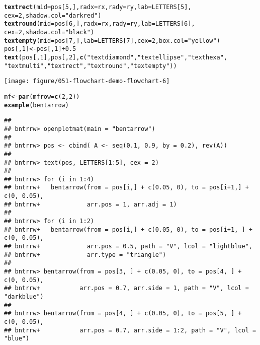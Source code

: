 \documentclass{article}\usepackage[]{graphicx}\usepackage[]{xcolor}
\makeatletter
\def\maxwidth{ %
  \ifdim\Gin@nat@width>\linewidth
    \linewidth
  \else
    \Gin@nat@width
  \fi
}
\newcommand{\hlnum}[1]{\textcolor[rgb]{0.686,0.059,0.569}{#1}}%
\newcommand{\hlsng}[1]{\textcolor[rgb]{0.192,0.494,0.8}{#1}}%
\newcommand{\hlopt}[1]{\textcolor[rgb]{0,0,0}{#1}}%
\newcommand{\hldef}[1]{\textcolor[rgb]{0.345,0.345,0.345}{#1}}%
\newcommand{\hlkwb}[1]{\textcolor[rgb]{0.69,0.353,0.396}{#1}}%
\newcommand{\hlkwc}[1]{\textcolor[rgb]{0.333,0.667,0.333}{#1}}%
\newcommand{\hlkwd}[1]{\textcolor[rgb]{0.737,0.353,0.396}{\textbf{#1}}}%
\newenvironment{kframe}{%
 \def\at@end@of@kframe{}%
 \ifinner\ifhmode%
  \def\at@end@of@kframe{\end{minipage}}%
  \begin{minipage}{\columnwidth}%
 \fi\fi%
 \def\FrameCommand##1{\hskip\@totalleftmargin \hskip-\fboxsep
 \colorbox{shadecolor}{##1}\hskip-\fboxsep
     \hskip-\linewidth \hskip-\@totalleftmargin \hskip\columnwidth}%
 \MakeFramed {\advance\hsize-\width
   \@totalleftmargin\z@ \linewidth\hsize
   \@setminipage}}%
 {\par\unskip\endMakeFramed%
 \at@end@of@kframe}
\newenvironment{knitrout}{}{} %
\makeatother
\begin{document}
\begin{knitrout}
\begin{kframe}
\begin{alltt}
\hlkwd{textrect}\hldef{(}\hlkwc{mid} \hldef{= pos[}\hlnum{5}\hldef{, ],} \hlkwc{radx} \hldef{= rx,} \hlkwc{rady} \hldef{= ry,} \hlkwc{lab} \hldef{= LETTERS[}\hlnum{5}\hldef{],}
    \hlkwc{cex} \hldef{=} \hlnum{2}\hldef{,} \hlkwc{shadow.col} \hldef{=} \hlsng{"darkred"}\hldef{)}
\hlkwd{textround}\hldef{(}\hlkwc{mid} \hldef{= pos[}\hlnum{6}\hldef{, ],} \hlkwc{radx} \hldef{= rx,} \hlkwc{rady} \hldef{= ry,} \hlkwc{lab} \hldef{= LETTERS[}\hlnum{6}\hldef{],}
    \hlkwc{cex} \hldef{=} \hlnum{2}\hldef{,} \hlkwc{shadow.col} \hldef{=} \hlsng{"black"}\hldef{)}
\hlkwd{textempty}\hldef{(}\hlkwc{mid} \hldef{= pos[}\hlnum{7}\hldef{, ],} \hlkwc{lab} \hldef{= LETTERS[}\hlnum{7}\hldef{],} \hlkwc{cex} \hldef{=} \hlnum{2}\hldef{,} \hlkwc{box.col} \hldef{=} \hlsng{"yellow"}\hldef{)}
\hldef{pos[,} \hlnum{1}\hldef{]} \hlkwb{<-} \hldef{pos[,} \hlnum{1}\hldef{]} \hlopt{+} \hlnum{0.5}
\hlkwd{text}\hldef{(pos[,} \hlnum{1}\hldef{], pos[,} \hlnum{2}\hldef{],} \hlkwd{c}\hldef{(}\hlsng{"textdiamond"}\hldef{,} \hlsng{"textellipse"}\hldef{,} \hlsng{"texthexa"}\hldef{,}
    \hlsng{"textmulti"}\hldef{,} \hlsng{"textrect"}\hldef{,} \hlsng{"textround"}\hldef{,} \hlsng{"textempty"}\hldef{))}
\end{alltt}
\end{kframe}
\texttt{[image: figure/051-flowchart-demo-flowchart-6]} 
\begin{kframe}\begin{alltt}
\hldef{mf} \hlkwb{<-} \hlkwd{par}\hldef{(}\hlkwc{mfrow} \hldef{=} \hlkwd{c}\hldef{(}\hlnum{2}\hldef{,} \hlnum{2}\hldef{))}
\hlkwd{example}\hldef{(bentarrow)}
\end{alltt}
\begin{verbatim}
## 
## bntrrw> openplotmat(main = "bentarrow")
## 
## bntrrw> pos <- cbind( A <- seq(0.1, 0.9, by = 0.2), rev(A))
## 
## bntrrw> text(pos, LETTERS[1:5], cex = 2)
## 
## bntrrw> for (i in 1:4) 
## bntrrw+   bentarrow(from = pos[i,] + c(0.05, 0), to = pos[i+1,] + c(0, 0.05),
## bntrrw+             arr.pos = 1, arr.adj = 1)
## 
## bntrrw> for (i in 1:2) 
## bntrrw+   bentarrow(from = pos[i,] + c(0.05, 0), to = pos[i+1, ] + c(0, 0.05),
## bntrrw+             arr.pos = 0.5, path = "V", lcol = "lightblue", 
## bntrrw+             arr.type = "triangle")
## 
## bntrrw> bentarrow(from = pos[3, ] + c(0.05, 0), to = pos[4, ] + c(0, 0.05),
## bntrrw+           arr.pos = 0.7, arr.side = 1, path = "V", lcol = "darkblue")
## 
## bntrrw> bentarrow(from = pos[4, ] + c(0.05, 0), to = pos[5, ] + c(0, 0.05),
## bntrrw+           arr.pos = 0.7, arr.side = 1:2, path = "V", lcol = "blue")

\end{verbatim}
\end{kframe}
\end{knitrout}
\end{document}
